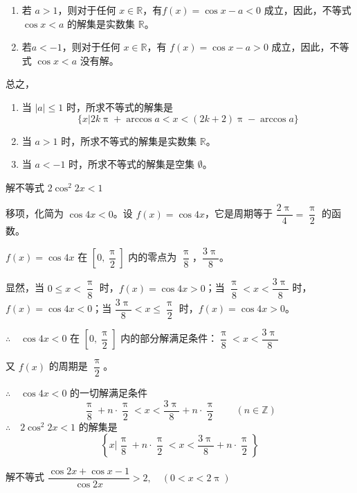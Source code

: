 \begin{solution}
\begin{enumerate}
\item 若 $a>1$，则对于任何 $x\in\mathbb{R}$，有$f(x)=\cos x-a<0$ 成立，因此，不等式 $\cos x<a$ 的解集是实数集 $\mathbb{R}$。
\item 若$a<-1$，则对于任何 $x\in\mathbb{R}$，有 $f(x)=\cos x-a>0$ 成立，因此，不等式 $\cos x<a$ 没有解。
\end{enumerate}

总之，
\begin{enumerate}
  \item 当 $|a|\leqslant 1$ 时，所求不等式的解集是
  \[\{x|2k\uppi  +\arccos a<x<(2k+2)\uppi -\arccos a\}\]
  \item 当 $a>1$ 时，所求不等式的解集是实数集 $\mathbb{R}$。
  \item 当 $a<-1$ 时，所求不等式的解集是空集 $\emptyset$。
\end{enumerate}
\end{solution}


\begin{example}
  解不等式 $2\cos^2 2x<1$
\end{example}

\begin{solution}
移项，化简为 $\cos4x<0$。设 $f(x)=\cos4x$，它是周期等于 $\dfrac{2\uppi}{4}=\dfrac{\uppi}{2}$ 的函数。

$f(x)=\cos4x$ 在 $\left[0,\dfrac{\uppi}{2}\right]$ 内的零点为 $\dfrac{\uppi}{8}$，$\dfrac{3\uppi}{8}$。

显然，当 $0\leqslant x<\dfrac{\uppi}{8}$ 时，$f(x)=\cos4x>0$；当 $\dfrac{\uppi}{8}<x<\dfrac{3\uppi}{8}$ 时，$f(x)=\cos4x<0$；当 $\dfrac{3\uppi}{8}<x\leqslant \dfrac{\uppi}{2}$ 时，$f(x)=\cos4x>0$。

$\therefore\quad \cos4x<0$ 在 $\left[0,\dfrac{\uppi}{2}\right]$ 内的部分解满足条件：$\dfrac{\uppi}{8}<x<\dfrac{3\uppi}{8}$

又 $f(x)$ 的周期是 $\dfrac{\uppi}{2}$。

$\therefore\quad \cos4x<0$ 的一切解满足条件
\[\frac{\uppi}{8}+n\cdot\frac{\uppi}{2}<x<\frac{3\uppi}{8}+n\cdot\frac{\uppi}{2}\qquad (n\in\mathbb{Z})\]
$\therefore\quad 2\cos^2 2x<1$ 的解集是
\[\left\{x\Big| \frac{\uppi}{8}+n\cdot\frac{\uppi}{2}<x<\frac{3\uppi}{8}+n\cdot\frac{\uppi}{2}\right\}\]
\end{solution}


\begin{example}
  解不等式 $\dfrac{\cos2x+\cos x-1}{\cos2x}>2,\quad (0<x<2\uppi)$
\end{example}

